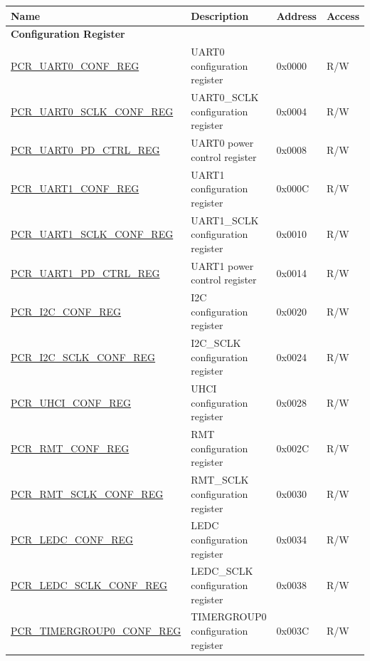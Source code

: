 \begin{longtable}{ | p{6cm} | p{7.2cm} | p{1.3cm} | p{1cm} | }
\hline\rowcolor{lightgray}
\textbf{Name} & \textbf{Description} &  \textbf{Address} & \textbf{Access} \\ \hline
\endhead
\multicolumn{4}{|l|}{\textbf{Configuration Register}} \\ \hline
\hyperref[regdesc:PCRUART0CONFREG]{PCR\_UART0\_CONF\_REG} & UART0 configuration register & 0x0000 & R/W \\ \hline
\hyperref[regdesc:PCRUART0SCLKCONFREG]{PCR\_UART0\_SCLK\_CONF\_REG} & UART0\_SCLK configuration register & 0x0004 & R/W \\ \hline
\hyperref[regdesc:PCRUART0PDCTRLREG]{PCR\_UART0\_PD\_CTRL\_REG} & UART0 power control register & 0x0008 & R/W \\ \hline
\hyperref[regdesc:PCRUART1CONFREG]{PCR\_UART1\_CONF\_REG} & UART1 configuration register & 0x000C & R/W \\ \hline
\hyperref[regdesc:PCRUART1SCLKCONFREG]{PCR\_UART1\_SCLK\_CONF\_REG} & UART1\_SCLK configuration register & 0x0010 & R/W \\ \hline
\hyperref[regdesc:PCRUART1PDCTRLREG]{PCR\_UART1\_PD\_CTRL\_REG} & UART1 power control register & 0x0014 & R/W \\ \hline
\hyperref[regdesc:PCRI2CCONFREG]{PCR\_I2C\_CONF\_REG} & I2C configuration register & 0x0020 & R/W \\ \hline
\hyperref[regdesc:PCRI2CSCLKCONFREG]{PCR\_I2C\_SCLK\_CONF\_REG} & I2C\_SCLK configuration register & 0x0024 & R/W \\ \hline
\hyperref[regdesc:PCRUHCICONFREG]{PCR\_UHCI\_CONF\_REG} & UHCI configuration register & 0x0028 & R/W \\ \hline
\hyperref[regdesc:PCRRMTCONFREG]{PCR\_RMT\_CONF\_REG} & RMT configuration register & 0x002C & R/W \\ \hline
\hyperref[regdesc:PCRRMTSCLKCONFREG]{PCR\_RMT\_SCLK\_CONF\_REG} & RMT\_SCLK configuration register & 0x0030 & R/W \\ \hline
\hyperref[regdesc:PCRLEDCCONFREG]{PCR\_LEDC\_CONF\_REG} & LEDC configuration register & 0x0034 & R/W \\ \hline
\hyperref[regdesc:PCRLEDCSCLKCONFREG]{PCR\_LEDC\_SCLK\_CONF\_REG} & LEDC\_SCLK configuration register & 0x0038 & R/W \\ \hline
\hyperref[regdesc:PCRTIMERGROUP0CONFREG]{PCR\_TIMERGROUP0\_CONF\_REG} & TIMERGROUP0 configuration register & 0x003C & R/W \\ \hline

\end{longtable}
